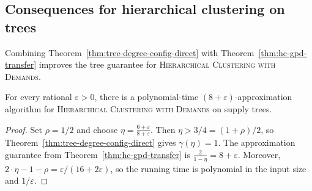 



\subsection{Consequences for hierarchical clustering on trees}

Combining Theorem~\ref{thm:tree-degree-config-direct} with Theorem~\ref{thm:hc-gpd-transfer} improves the tree guarantee for \textsc{Hierarchical Clustering with Demands}.

\begin{corollary}\label{cor:tree-hc-improved}
    For every rational $\varepsilon>0$, there is a polynomial-time $(8+\varepsilon)$-approximation algorithm for \textsc{Hierarchical Clustering with Demands} on supply trees.
\end{corollary}
\begin{proof}
    Set $\rho=1/2$ and choose $
        \eta=\frac{6+\varepsilon}{8+\varepsilon}.$
    Then $\eta>3/4=(1+\rho)/2$, so Theorem~\ref{thm:tree-degree-config-direct} gives $\gamma(\eta)=1$. The approximation guarantee from Theorem~\ref{thm:hc-gpd-transfer} is $
        \frac{2}{1-\eta}=8+\varepsilon.$
    Moreover, $2\cdot\eta-1-\rho=\varepsilon/(16+2\varepsilon)$, so the running time is polynomial in the input size and $1/\varepsilon$.
\end{proof}

